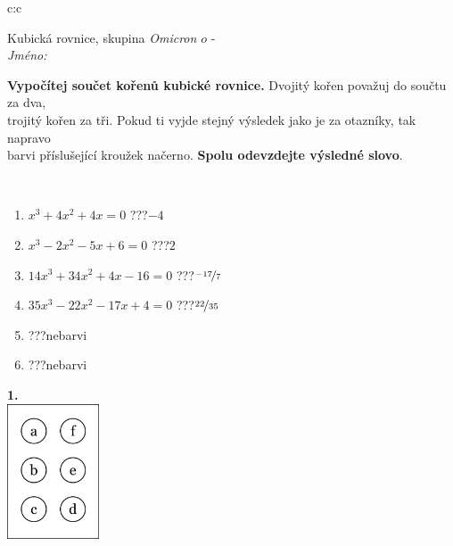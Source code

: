 \documentclass[10pt]{report}
\newcommand\omicron{o}
\begin{document}
\begin{tabular}{c:c}
\begin{minipage}[c][104.5mm][t]{0.5\linewidth}
\begin{center}
\vspace{7mm}
{\huge Kubická rovnice, skupina \textit{Omicron $\omicron$} -}\\[5mm]
\textit{Jméno:}\phantom{xxxxxxxxxxxxxxxxxxxxxxxxxxxxxxxxxxxxxxxxxxxxxxxxxxxxxxxxxxxxxxxxx}\\[5mm]
\begin{minipage}{0.95\linewidth}
\begin{center}
\textbf{Vypočítej součet kořenů kubické rovnice.} Dvojitý kořen považuj do součtu za dva,\\trojitý kořen za tři. Pokud ti vyjde stejný výsledek jako je za otazníky, tak napravo\\barvi příslušející kroužek načerno. \textbf{Spolu odevzdejte výsledné slovo}.
\end{center}
\end{minipage}
\\[1mm]
\begin{minipage}{0.79\linewidth}
\begin{center}
\begin{varwidth}{\linewidth}
\begin{enumerate}
\Large
\item $x^3+4x^2+4x=0$\quad \dotfill\; ???\;\dotfill \quad $-4$
\item $x^3-2x^2-5x+6=0$\quad \dotfill\; ???\;\dotfill \quad $2$
\item $14x^3+34x^2+4x-16=0$\quad \dotfill\; ???\;\dotfill \quad $\nicefrac{-17}{7}$
\item $35x^3-22x^2-17x+4=0$\quad \dotfill\; ???\;\dotfill \quad $\nicefrac{22}{35}$
\item \quad \dotfill\; ???\;\dotfill \quad nebarvi
\item \quad \dotfill\; ???\;\dotfill \quad nebarvi
\end{enumerate}
\end{varwidth}
\end{center}
\end{minipage}
\begin{minipage}{0.20\linewidth}
\begin{center}
{\Huge\bfseries 1.} \\[2mm]
\includegraphics[height=40mm]{../images/braille.png}

\end{center}
\end{minipage}
\end{center}
\end{minipage}
\end{tabular}
\end{document}
